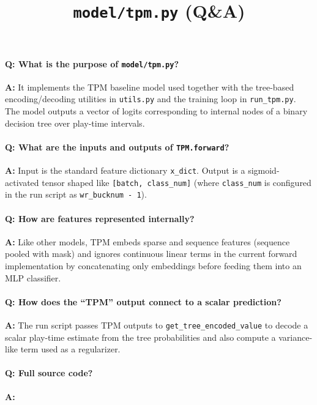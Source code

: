 \documentclass[11pt]{article}
\title{\texttt{model/tpm.py} (Q\&A)}
\author{}
\date{}
\begin{document}
\maketitle

\paragraph{Q: What is the purpose of \texttt{model/tpm.py}?}
\textbf{A:} It implements the TPM baseline model used together with the tree-based encoding/decoding utilities in \lstinline|utils.py| and the training loop in \lstinline|run_tpm.py|. The model outputs a vector of logits corresponding to internal nodes of a binary decision tree over play-time intervals.

\paragraph{Q: What are the inputs and outputs of \lstinline|TPM.forward|?}
\textbf{A:} Input is the standard feature dictionary \lstinline|x_dict|. Output is a sigmoid-activated tensor shaped like \lstinline|[batch, class_num]| (where \lstinline|class_num| is configured in the run script as \lstinline|wr_bucknum - 1|).

\paragraph{Q: How are features represented internally?}
\textbf{A:} Like other models, TPM embeds sparse and sequence features (sequence pooled with mask) and ignores continuous linear terms in the current forward implementation by concatenating only embeddings before feeding them into an MLP classifier.

\paragraph{Q: How does the ``TPM'' output connect to a scalar prediction?}
\textbf{A:} The run script passes TPM outputs to \lstinline|get_tree_encoded_value| to decode a scalar play-time estimate from the tree probabilities and also compute a variance-like term used as a regularizer.

\paragraph{Q: Full source code?}
\textbf{A:}

\end{document}
